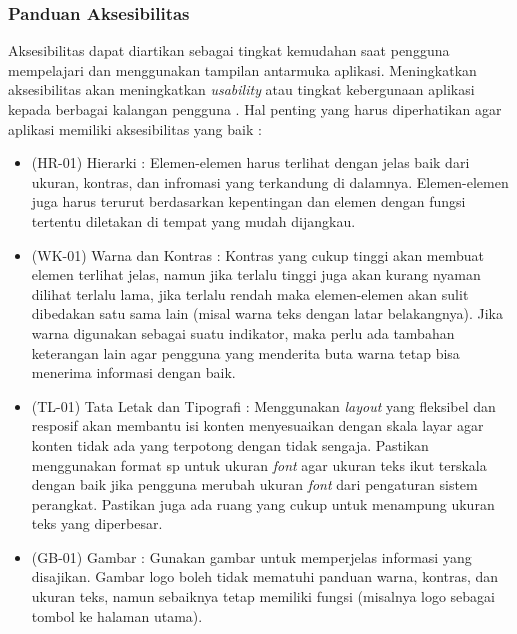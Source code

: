 \subsubsection{Panduan Aksesibilitas}
Aksesibilitas dapat diartikan sebagai tingkat kemudahan saat pengguna mempelajari dan menggunakan tampilan antarmuka aplikasi. Meningkatkan aksesibilitas akan meningkatkan \textit{usability} atau tingkat kebergunaan aplikasi kepada berbagai kalangan pengguna \cite{materialdesign}. Hal penting yang harus diperhatikan agar aplikasi memiliki aksesibilitas yang baik :
\begin{itemize}
    \item (HR-01) Hierarki : Elemen-elemen harus terlihat dengan jelas baik dari ukuran, kontras, dan infromasi yang terkandung di dalamnya. Elemen-elemen juga harus terurut berdasarkan kepentingan dan elemen dengan fungsi tertentu diletakan di tempat yang mudah dijangkau.
    \item (WK-01) Warna dan Kontras : Kontras yang cukup tinggi akan membuat elemen terlihat jelas, namun jika terlalu tinggi juga akan kurang nyaman dilihat terlalu lama, jika terlalu rendah maka elemen-elemen akan sulit dibedakan satu sama lain (misal warna teks dengan latar belakangnya). Jika warna digunakan sebagai suatu indikator, maka perlu ada tambahan keterangan lain agar pengguna yang menderita buta warna tetap bisa menerima informasi dengan baik.
    \item (TL-01) Tata Letak dan Tipografi : Menggunakan \textit{layout} yang fleksibel dan resposif akan membantu isi konten menyesuaikan dengan skala layar agar konten tidak ada yang terpotong dengan tidak sengaja. Pastikan menggunakan format sp untuk ukuran \textit{font} agar ukuran teks ikut terskala dengan baik jika pengguna merubah ukuran \textit{font} dari pengaturan sistem perangkat. Pastikan juga ada ruang yang cukup untuk menampung ukuran teks yang diperbesar.
    \item (GB-01) Gambar : Gunakan gambar untuk memperjelas informasi yang disajikan. Gambar logo boleh tidak mematuhi panduan warna, kontras, dan ukuran teks, namun sebaiknya tetap memiliki fungsi (misalnya logo sebagai tombol ke halaman utama).  
\end{itemize}

